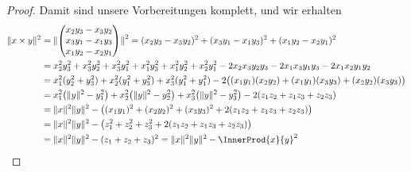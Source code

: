 \documentclass[../full]{subfiles}
\begin{document}
\begin{proof}
        Damit sind unsere Vorbereitungen komplett,
        und wir erhalten
        \begin{align*}
            \norm{x \times y}^2 &
            = \norm[\Bigger]{ \begin{pmatrix}
                    x_2 y_3 - x_3 y_2 \\ x_3 y_1 - x_1 y_3 \\ x_1 y_2 - x_2 y_1
                \end{pmatrix} }^2
            = \paren{x_2 y_3 - x_3 y_2}^2
                + \paren{x_3 y_1 - x_1 y_3}^2
                + \paren{x_1 y_2 - x_2 y_1}^2
            \\ &
            = x_2^2 y_3^2 + x_3^2 y_2^2
                + x_3^2 y_1^2 + x_1^2 y_3^2
                + x_1^2 y_2^2 + x_2^2 y_1^2
                - 2 x_2 x_3 y_2 y_3 - 2 x_1 x_3 y_1 y_3 - 2 x_1 x_2 y_1 y_2
            \\ &
            = x_1^2 \paren{y_2^2 + y_3^2}
                + x_2^2 \paren{y_1^2 + y_3^2}
                + x_3^2 \paren{y_1^2 + y_1^2}
                - 2 \paren[\big]{
                    \paren{x_1 y_1} \paren{x_2 y_2}
                    + \paren{x_1 y_1} \paren{x_3 y_3}
                    + \paren{x_2 y_2} \paren{x_3 y_3}
                }
            \\ &
            = x_1^2 \paren[\big]{\norm{y}^2 - y_1^2}
                + x_2^2 \paren[\big]{\norm{y}^2 - y_2^2}
                + x_3^2 \paren[\big]{\norm{y}^2 - y_3^2}
                - 2 \paren{z_1 z_2 + z_1 z_3 + z_2 z_3}
            \\ &
            = \norm{x}^2 \norm{y}^2 - \paren[\big]{
                \paren{x_1 y_1}^2 + \paren{x_2 y_2}^2 + \paren{x_3 y_3}^2
                + 2 \paren{z_1 z_2 + z_1 z_3 + z_2 z_3}
            }
            \\ &
            = \norm{x}^2 \norm{y}^2 - \paren[\big]{
                z_1^2 + z_2^2 + z_3^2 + 2 \paren{z_1 z_2 + z_1 z_3 + z_2 z_3}
            }
            \\ &
            = \norm{x}^2 \norm{y}^2 - \paren{z_1 + z_2 + z_3}^2
            = \norm{x}^2 \norm{y}^2 - \InnerProd{x}{y}^2
            \qedhere
        \end{align*}
    \end{proof}
\end{document}
